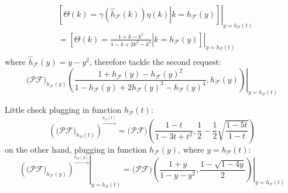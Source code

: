 \begin{displaymath}
    \begin{split}
        &\left.\left[\left.\Theta(k)=\gamma(\hat{h}_{\mathcal{F}}(k))\eta(k) \right| k=h_{\mathcal{F}}(y) \right]\right|_{y=h_{\mathcal{P}}(t)}\\
        &= \left.\left[\left.\Theta(k)=\frac{1+k-k^2}{1-k+ 2k^3 - k^4} \right| k=h_{\mathcal{F}}(y) \right]\right|_{y=h_{\mathcal{P}}(t)}\\
    \end{split}
\end{displaymath}
where $\hat{h}_{\mathcal{F}}(y)=y-y^2$, therefore tackle the second request:
\begin{displaymath}
    \left.\big(\mathcal{P}\mathcal{F}\big)_{h_{\mathcal{F}}(y)} \left(
        \frac{1+h_{\mathcal{F}}(y)-h_{\mathcal{F}}(y)^2}{1-h_{\mathcal{F}}(y)+ 2h_{\mathcal{F}}(y)^3 - h_{\mathcal{F}}(y)^4} ,
        h_{\mathcal{F}}(y) \right)\right|_{y=h_{\mathcal{P}}(t)}
\end{displaymath}

Little check plugging in function $h_{\mathcal{P}}(t)$:
\begin{displaymath}
    \left(\big(\mathcal{P}\mathcal{F}\big)_{h_{\mathcal{P}}(t)}\right)^{\stackrel{h_{\mathcal{P}}(t)}{\rightarrow}}
        = \big(\mathcal{P}\mathcal{F}\big)\left(\frac{1-t}{1-3t+t^2}, \frac{1}{2}-\frac{1}{2}\sqrt{\frac{1-5t}{1-t}} \right)
\end{displaymath}
on the other hand, plugging in function $h_{\mathcal{F}}(y)$, where $y=h_{\mathcal{P}}(t)$:
\begin{displaymath}
    \left.\left(\big(\mathcal{P}\mathcal{F}\big)_{h_{\mathcal{F}}(y)}\right)^{\stackrel{h_{\mathcal{F}}(y)}{\rightarrow}}\right|_{y=h_{\mathcal{P}}(t)}
        = \left.\big(\mathcal{P}\mathcal{F}\big)\left(\frac{1+y}{1-y-y^2}, \frac{1-\sqrt{1-4y}}{2} \right)\right|_{y=h_{\mathcal{P}}(t)}
\end{displaymath}
